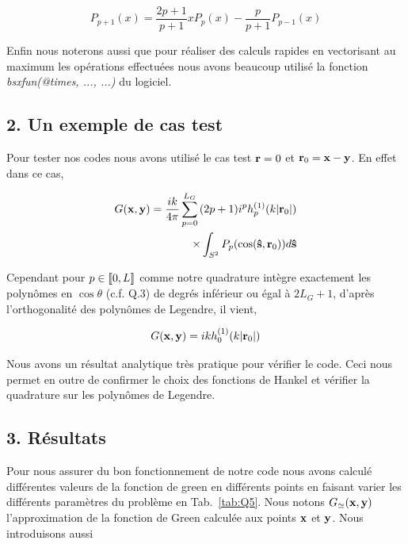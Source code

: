 \documentclass[10pt]{article}
\begin{document}
\begin{multicols}{2}
\begin{equation}
	P_{p+1}(x) =  \frac{2p+1}{p+1}xP_{p}(x) - \frac{p}{p+1}P_{p-1}(x) 
\end{equation}


Enfin nous noterons aussi que pour réaliser des calculs rapides en vectorisant au maximum les opérations effectuées nous avons beaucoup utilisé la fonction \textit{bsxfun(@times, ..., ...)} du logiciel.





\vspace*{10pt}


\subsection*{2. Un exemple de cas test}

Pour tester nos codes nous avons utilisé le cas test ${\bf r} = 0$ et ${\bf r}_0 = {\bf x} - {\bf y}$. En effet dans ce cas,

\begin{equation}
\begin{split}
G({\bf x},{\bf y}) = \frac{ik}{4\pi}\sum_{p=0}^{L_G}{} (2p+1)i^{p}h_p^{(1)}(k|{\bf r}_0|)  \\
 \times\int_{S^{2}}P_p(\cos({\bf \hat{s}}, {\bf r}_0))d{\bf \hat{s}} 
\end{split}
\end{equation}

Cependant pour $p\in \llbracket 0,L \rrbracket $ comme notre quadrature intègre exactement les polynômes en $\cos{\theta}$ (c.f. Q.3) de degrés inférieur ou égal à $2L_G+1$, d'après l’orthogonalité des polynômes de Legendre, il vient, 

\begin{equation}
G({\bf x},{\bf y}) = ikh^{(1)}_{0}(k|{\bf r}_0|)
\end{equation}

Nous avons un résultat analytique très pratique pour vérifier le code. Ceci nous permet en outre de confirmer le choix des fonctions de Hankel et vérifier la quadrature sur les polynômes de Legendre. 



\vspace*{10pt}

\subsection*{3. Résultats}

Pour nous assurer du bon fonctionnement de notre code nous avons calculé différentes valeurs de la fonction de green en différents points en faisant varier les différents paramètres du problème en Tab.~\ref{tab:Q5}. Nous notons $G_{\simeq}({\bf x}, {\bf y})$ l'approximation de la fonction de Green calculée aux points ${\bf x}$ et ${\bf y}$.  Nous introduisons aussi 



\end{multicols}
\end{document}
